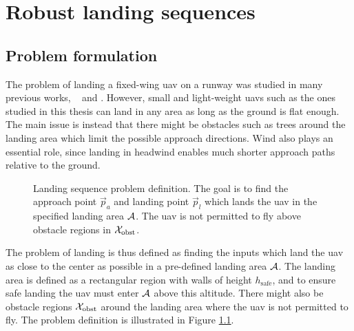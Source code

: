 \chapter{Robust landing sequences}\label{cha:landing}
\section{Problem formulation}
The problem of landing a fixed-wing \ac{uav} on a runway was studied in many previous works, \eg\ \cite{emergency_landing} and \cite{landing_on_vehicle}. However, small and light-weight \acp{uav} such as the ones studied 
in this thesis can land in any area as long as the ground is flat enough. The main issue is instead that there might be obstacles such as trees around the landing area which limit the possible 
approach directions. Wind also plays an essential role, since landing in headwind enables much shorter approach paths relative to the ground.

\begin{figure}
    \begin{center}
    \end{center}
    \caption{Landing sequence problem definition. The goal is to find the approach point $\vec{p}_a$ and landing point $\vec{p}_l$ which lands the \ac{uav} in the specified landing area $\mathcal{A}$. The \ac{uav} is not permitted to fly above obstacle regions in $\mathcal{X}_{\text{obst}}$.}
    \label{fig:land}          
\end{figure}

The problem of landing is thus defined as finding the inputs which land the \ac{uav} as close to the center as possible in a pre-defined landing area $\mathcal{A}$. The landing area is 
defined as a rectangular region with walls of height $h_{\text{safe}}$, and to ensure safe landing the \ac{uav} must enter $\mathcal{A}$ above this altitude. 
There might also be obstacle regions $\mathcal{X}_{\text{obst}}$ around the landing area where the \ac{uav} is not permitted to fly. The problem definition is illustrated in Figure \ref{fig:land}.

